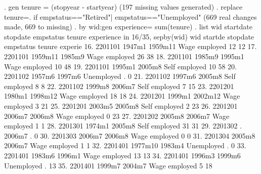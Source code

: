 . gen tenure = (stopyear - startyear)
(197 missing values generated)
{\smallskip}
. replace tenure=. if empstatus=="Retired"| empstatus=="Unemployed"
(669 real changes made, 669 to missing)
{\smallskip}
. by wid:gen experience= sum(tenure)
{\smallskip}
. list wid startdate stopdate empstatus tenure experience in 16/35, sepby(wid)
{\smallskip}
     {\TLC}
     {\VBAR}     wid   startd{\tytilde}e   stopdate       empstatus   tenure   experi{\tytilde}e {\VBAR}
     {\LFTT}
 16. {\VBAR} 2201101     1947m1    1959m11   Wage employed       12         12 {\VBAR}
 17. {\VBAR} 2201101    1959m11     1985m9   Wage employed       26         38 {\VBAR}
 18. {\VBAR} 2201101     1985m9     1995m1   Wage employed       10         48 {\VBAR}
 19. {\VBAR} 2201101     1995m1     2005m8   Self employed       10         58 {\VBAR}
     {\LFTT}
 20. {\VBAR} 2201102     1957m6     1997m6      Unemployed        .          0 {\VBAR}
 21. {\VBAR} 2201102     1997m6     2005m8   Self employed        8          8 {\VBAR}
 22. {\VBAR} 2201102     1999m8     2006m7   Self employed        7         15 {\VBAR}
     {\LFTT}
 23. {\VBAR} 2201201     1980m1    1998m12   Wage employed       18         18 {\VBAR}
 24. {\VBAR} 2201201     1999m1    2002m12   Wage employed        3         21 {\VBAR}
 25. {\VBAR} 2201201     2003m5     2005m8   Self employed        2         23 {\VBAR}
 26. {\VBAR} 2201201     2006m7     2006m8   Wage employed        0         23 {\VBAR}
     {\LFTT}
 27. {\VBAR} 2201202     2005m8     2006m7   Wage employed        1          1 {\VBAR}
     {\LFTT}
 28. {\VBAR} 2201301     1974m1     2005m8   Self employed       31         31 {\VBAR}
     {\LFTT}
 29. {\VBAR} 2201302          .     2006m7                        .          0 {\VBAR}
     {\LFTT}
 30. {\VBAR} 2201303     2006m7     2006m8   Wage employed        0          0 {\VBAR}
     {\LFTT}
 31. {\VBAR} 2201304     2005m8     2006m7   Wage employed        1          1 {\VBAR}
     {\LFTT}
 32. {\VBAR} 2201401    1977m10     1983m4      Unemployed        .          0 {\VBAR}
 33. {\VBAR} 2201401     1983m6     1996m1   Wage employed       13         13 {\VBAR}
 34. {\VBAR} 2201401     1996m3     1999m6      Unemployed        .         13 {\VBAR}
 35. {\VBAR} 2201401     1999m7     2004m7   Wage employed        5         18 {\VBAR}
     {\BLC}
